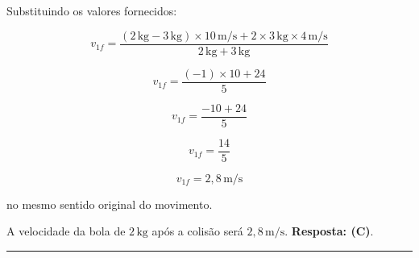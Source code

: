 \documentclass[a4paper,12pt]{article}
\begin{document}
\begin{flushleft}
Substituindo os valores fornecidos:

\[
v_{1f} = \frac{(2\,\text{kg} - 3\,\text{kg}) \times 10\,\text{m/s} + 2 \times 3\,\text{kg} \times 4\,\text{m/s}}{2\,\text{kg} + 3\,\text{kg}}
\]

\[
v_{1f} = \frac{(-1)\times10 + 24}{5}
\]

\[
v_{1f} = \frac{-10 + 24}{5}
\]

\[
v_{1f} = \frac{14}{5}
\]

\[
\boxed{v_{1f} = 2,8\,\text{m/s}}
\]

no mesmo sentido original do movimento.

A velocidade da bola de \(2\,\text{kg}\) após a colisão será \(2,8\,\text{m/s}\). \textbf{Resposta: \colorbox{green!50}{(C)}}. 

\end{flushleft}

\noindent\rule{\linewidth}{0.6pt}\\
\end{document}
